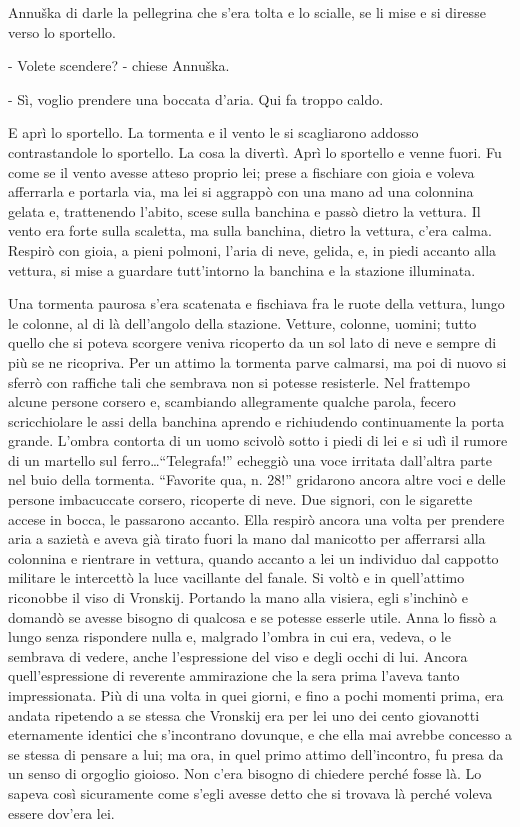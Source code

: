 Annuška di darle la pellegrina che s'era tolta e lo scialle, se li mise e si diresse verso lo sportello. 

- Volete scendere? - chiese Annuška. 

- Sì, voglio prendere una boccata d'aria. Qui fa troppo caldo. 

E aprì lo sportello. La tormenta e il vento le si scagliarono addosso contrastandole lo sportello. La cosa la divertì. Aprì lo sportello e venne fuori. Fu come se il vento avesse atteso proprio lei; prese a fischiare con gioia e voleva afferrarla e portarla via, ma lei si aggrappò con una mano ad una colonnina gelata e, trattenendo l'abito, scese sulla banchina e passò dietro la vettura. Il vento era forte sulla scaletta, ma sulla banchina, dietro la vettura, c'era calma. Respirò con gioia, a pieni polmoni, l'aria di neve, gelida, e, in piedi accanto alla vettura, si mise a guardare tutt'intorno la banchina e la stazione illuminata. 
\enlargethispage*{1\baselineskip}

Una tormenta paurosa s'era scatenata e fischiava fra le ruote della vettura, lungo le colonne, al di là dell'angolo della stazione. Vetture, colonne, uomini; tutto quello che si poteva scorgere veniva ricoperto da un sol lato di neve e sempre di più se ne ricopriva. Per un attimo la tormenta parve calmarsi, ma poi di nuovo si sferrò con raffiche tali che sembrava non si potesse resisterle. Nel frattempo alcune persone corsero e, scambiando allegramente qualche parola, fecero scricchiolare le assi della banchina aprendo e richiudendo continuamente la porta grande. L'ombra contorta di un uomo scivolò sotto i piedi di lei e si udì il rumore di un martello sul ferro\ldots{}``Telegrafa!'' echeggiò una voce irritata dall'altra parte nel buio della tormenta. ``Favorite qua, n. 28!'' gridarono ancora altre voci e delle persone imbacuccate corsero, ricoperte di neve. Due signori, con le sigarette accese in bocca, le passarono accanto. Ella respirò ancora una volta per prendere aria a sazietà e aveva già tirato fuori la mano dal manicotto per afferrarsi alla colonnina e rientrare in vettura, quando accanto a lei un individuo dal cappotto militare le intercettò la luce vacillante del fanale. Si voltò e in quell'attimo riconobbe il viso di Vronskij. Portando la mano alla visiera, egli s'inchinò e domandò se avesse bisogno di qualcosa e se potesse esserle utile. Anna lo fissò a lungo senza rispondere nulla e, malgrado l'ombra in cui era, vedeva, o le sembrava di vedere, anche l'espressione del viso e degli occhi di lui. Ancora quell'espressione di reverente ammirazione che la sera prima l'aveva tanto impressionata. Più di una volta in quei giorni, e fino a pochi momenti prima, era andata ripetendo a se stessa che Vronskij era per lei uno dei cento giovanotti eternamente identici che s'incontrano dovunque, e che ella mai avrebbe concesso a se stessa di pensare a lui; ma ora, in quel primo attimo dell'incontro, fu presa da un senso di orgoglio gioioso. Non c'era bisogno di chiedere perché fosse là. Lo sapeva così sicuramente come s'egli avesse detto che si trovava là perché voleva essere dov'era lei. 

